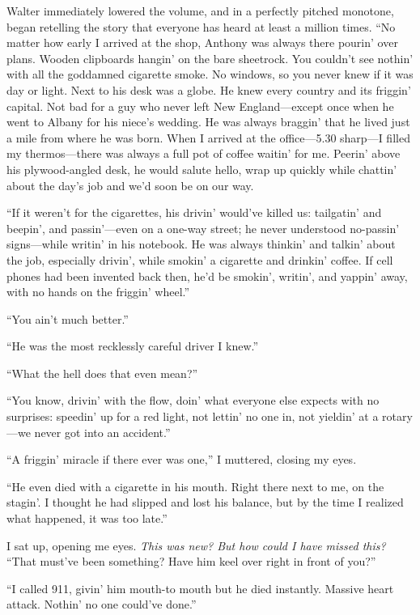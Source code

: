 Walter immediately lowered the volume, and in a perfectly pitched
monotone, began retelling the story that everyone has heard at least a
million times. ``No matter how early I arrived at the shop, Anthony was
always there pourin' over plans. Wooden clipboards hangin' on the bare
sheetrock. You couldn't see nothin' with all the goddamned cigarette
smoke. No windows, so you never knew if it was day or light. Next to his
desk was a globe. He knew every country and its friggin' capital. Not
bad for a guy who never left New England---except once when he went to
Albany for his niece's wedding. He was always braggin' that he lived
just a mile from where he was born. When I arrived at the office---5.30
sharp---I filled my thermos---there was always a full pot of coffee
waitin' for me. Peerin' above his plywood-angled desk, he would salute
hello, wrap up quickly while chattin' about the day's job and we'd soon
be on our way.

``If it weren't for the cigarettes, his drivin' would've killed us:
tailgatin' and beepin', and passin'---even on a one-way street; he never
understood no-passin' signs---while writin' in his notebook. He was
always thinkin' and talkin' about the job, especially drivin', while
smokin' a cigarette and drinkin' coffee. If cell phones had been
invented back then, he'd be smokin', writin', and yappin' away, with no
hands on the friggin' wheel.''

``You ain't much better.''

``He was the most recklessly careful driver I knew.''

``What the hell does that even mean?''

``You know, drivin' with the flow, doin' what everyone else expects with
no surprises: speedin' up for a red light, not lettin' no one in, not
yieldin' at a rotary---we never got into an accident.''

``A friggin' miracle if there ever was one,'' I muttered, closing my
eyes.

``He even died with a cigarette in his mouth. Right there next to me, on
the stagin'. I thought he had slipped and lost his balance, but by the
time I realized what happened, it was too late.''

I sat up, opening me eyes. \emph{This was new? But how could I have
missed this?} ``That must've been something? Have him keel over right in
front of you?''

``I called 911, givin' him mouth-to mouth but he died instantly. Massive
heart attack. Nothin' no one could've done.''

